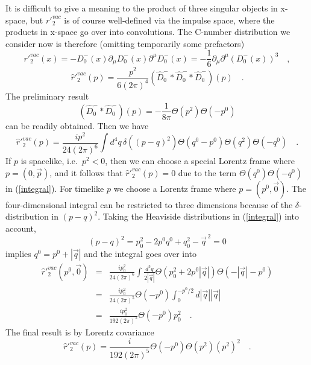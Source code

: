 \documentclass[a4paper,11pt]{article}
\begin{document}
It is difficult to give a meaning to the product of three singular objects
in x-space, but $r'^{vac}_2$ is of course well-defined via the impulse space,
where the products in x-space go over into convolutions.
The C-number distribution we consider now is therefore
(omitting temporarily some prefactors)
\begin{equation}
r'^{vac}_2(x)=-D_0^-(x) \partial_\mu D_0^-(x) \partial^\mu D_0^-(x)=
-\frac{1}{6} \partial_\mu \partial^\mu (D_0^{-}(x))^3 \quad ,
\end{equation}
\begin{equation}
\hat{r}'^{vac}_2(p)=\frac{p^2}{6(2 \pi)^4} (\hat{D}^-_0 \ast \hat{D}^-_0
\ast \hat{D}^-_0)(p) \quad .
\end{equation}
The preliminary result
\begin{equation}
 (\hat{D}^-_0 \ast \hat{D}^-_0)(p)=-\frac{1}{8 \pi} \Theta(p^2) \Theta(-p^0)
\end{equation}
can be readily obtained. Then we have
\begin{equation}
\hat{r}'^{vac}_2(p)=\frac{i p^2}{24(2 \pi)^6} \int d^4q \, \delta((p-q)^2)
\Theta(q^0-p^0) \Theta(q^2) \Theta(-q^0) \quad . \label{integral}
\end{equation}
If $p$ is spacelike, i.e.\ $p^2<0$, then we can choose a special Lorentz frame
where $p=(0,\vec{p})$, and it follows that
$\hat{r}'^{vac}_2(p)=0$ due to the term
$\Theta(q^0) \Theta(-q^0)$ in (\ref{integral}).
For timelike $p$ we choose a Lorentz frame where $p=(p^0,\vec{0})$.
The four-dimensional integral can be restricted to three dimensions
because of the $\delta$-distribution in $(p-q)^2$.
Taking the Heaviside distributions in (\ref{integral}) into account,
\begin{equation}
(p-q)^2=p_0^2-2p^0q^0+q_0^2-\vec{q}^{\,2}=0
\end{equation}
implies $q^0=p^0+|\vec{q}|$ and the integral
goes over into
\begin{eqnarray}
\hat{r}'^{vac}_2(p^0,\vec{0})&=&\frac{ip_0^2}{24(2 \pi)^6} \int
\frac{d^3q}{2 |\vec{q}|} \Theta(p_0^2+2p^0 |\vec{q}|)
\Theta(-|\vec{q}|-p^0) \nonumber \\
&=&\frac{ip_0^2}{24 (2 \pi)^5} \Theta(-p^0) \int_0^{-p^0/2}
d|\vec{q}| |\vec{q}| \nonumber \\
&=&\frac{ip_0^2}{192 (2 \pi)^5} \Theta(-p^0) p_0^2 \quad .
\end{eqnarray}
The final result is by Lorentz covariance
\begin{equation}
\hat{r}'^{vac}_2(p)=\frac{i}{192 (2 \pi)^5} \Theta(-p^0) \Theta(p^2) (p^2)^2 
\quad .
\end{equation}
\end{document}
